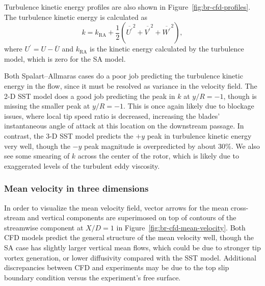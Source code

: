Turbulence kinetic energy profiles are also shown in
Figure~\ref{fig:br-cfd-profiles}. The turbulence kinetic energy is calculated as
\begin{equation}
    k = k_{\mathrm{RA}} + \frac{1}{2} \left(
    \overline{U^\prime}^2 +
    \overline{V^\prime}^2 +
    \overline{W^\prime}^2 \right),
    \label{eq:k}
\end{equation}
where $U^\prime = U - \overline{U}$ and $k_{\mathrm{RA}}$ is the kinetic energy
calculated by the turbulence model, which is zero for the SA model.

Both Spalart--Allmaras cases do a poor job predicting the turbulence kinetic
energy in the flow, since it must be resolved as variance in the velocity field.
The 2-D SST model does a good job predicting the peak in $k$ at $y/R=-1$, though
is missing the smaller peak at $y/R=-1$. This is once again likely due to
blockage issues, where local tip speed ratio is decreased, increasing the
blades' instantaneous angle of attack at this location on the downstream
passage. In contrast, the 3-D SST model predicts the $+y$ peak in turbulence
kinetic energy very well, though the $-y$ peak magnitude is overpredicted by
about 30\%. We also see some smearing of $k$ across the center of the rotor,
which is likely due to exaggerated levels of the turbulent eddy viscosity.


\subsubsection{Mean velocity in three dimensions}

In order to visualize the mean velocity field, vector arrows for the mean
cross-stream and vertical components are superimosed on top of contours of the
streamwise component at $X/D=1$ in Figure~\ref{fig:br-cfd-mean-velocity}. Both
CFD models predict the general structure of the mean velocity well, though the
SA case has slightly larger vertical mean flows, which could be due to stronger
tip vortex generation, or lower diffusivity compared with the SST model.
Additional discrepancies between CFD and experiments may be due to the top slip
boundary condition versus the experiment's free surface.


